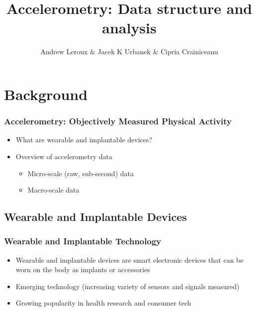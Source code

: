 \documentclass[10pt]{beamer}\usepackage[]{graphicx}\usepackage[]{color}
\newcommand\makebeamertitle{\frame{\maketitle}}%
\begin{document}
\title[]{Accelerometry: Data structure and analysis}
\author[]{Andrew Leroux \& Jacek K Urbanek \& Cipria Crainiceanu}
\makebeamertitle




\section{Background}

\begin{frame}
\frametitle{Accelerometry: Objectively Measured Physical Activity}
\begin{itemize}
\item What are wearable and implantable devices?
\item Overview of accelerometry data 
    \begin{itemize}
    \item Micro-scale (raw, sub-second) data
    \item Macro-scale data
    \end{itemize}
\end{itemize}
\end{frame}


\subsection{Wearable and Implantable Devices}


\begin{frame}
\frametitle{Wearable and Implantable Technology}
\begin{itemize}
\item Wearable and implantable devices are smart electronic devices that can be worn on the body as implants or accessories
\item Emerging technology (increasing variety of sensors and signals measured)
\item Growing popularity in health research and consumer tech
\end{itemize}
\end{frame}
\end{document}
